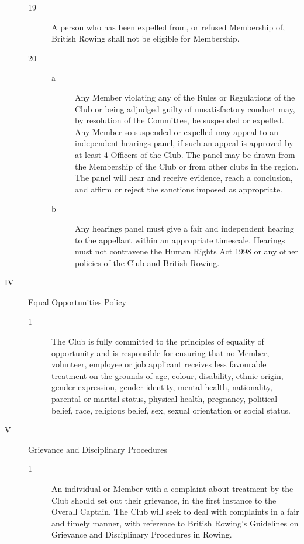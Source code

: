 \documentclass{article}
\begin{document}
\begin{description}
\begin{description}
	\item[19] A person who has been expelled from, or refused Membership of, British
	Rowing shall not be eligible for Membership.\\
	
	\item[20] 
	\begin{description}
		\item[a] Any Member violating any of the Rules or Regulations of the Club or
		being adjudged guilty of unsatisfactory conduct may, by resolution of
		the Committee, be suspended or expelled. Any Member so suspended
		or expelled may appeal to an independent hearings panel, if such an
		appeal is approved by at least 4 Officers of the Club. The panel may be
		drawn from the Membership of the Club or from other clubs in the
		region. The panel will hear and receive evidence, reach a conclusion,
		and affirm or reject the sanctions imposed as appropriate.\\
		
		\item[b] Any hearings panel must give a fair and independent hearing to the
		appellant within an appropriate timescale. Hearings must not
		contravene the Human Rights Act 1998 or any other policies of the
		Club and British Rowing.
	\end{description}
	\end{description}

	\item[IV] Equal Opportunities Policy
	\begin{description}
		\item[1] The Club is fully committed to the principles of equality of opportunity and is
		responsible for ensuring that no Member, volunteer, employee or job applicant
		receives less favourable treatment on the grounds of age, colour, disability,
		ethnic origin, gender expression, gender identity, mental health, nationality,
		parental or marital status, physical health, pregnancy, political belief, race,
		religious belief, sex, sexual orientation or social status.
	\end{description}

	\item[V] Grievance and Disciplinary Procedures
	\begin{description}
		\item[1] An individual or Member with a complaint about treatment by the Club should
		set out their grievance, in the first instance to the Overall Captain. The Club
		will seek to deal with complaints in a fair and timely manner, with reference to
		British Rowing’s Guidelines on Grievance and Disciplinary Procedures in
		Rowing.
	\end{description}


\end{description}
\end{document}
